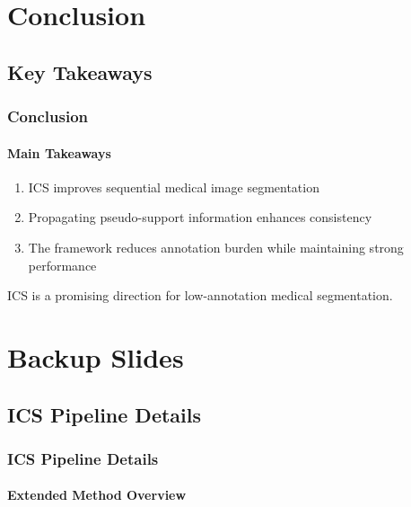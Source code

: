 \documentclass[nometaot,lecture,amberg,autotoc,toc=twocolumn,indicatelastpageofframe,footlinebox]{OTHAWbeamer}
\begin{document}

\section{Conclusion}

\subsection{Key Takeaways}

\begin{frame}
    \frametitle{Conclusion}
    \framesubtitle{Main Takeaways}

    \begin{enumerate}
        \item ICS improves sequential medical image segmentation

        \item Propagating pseudo-support information enhances consistency

        \item The framework reduces annotation burden while maintaining strong performance
    \end{enumerate}

    \vspace{1em}

    \centering
    \Large
    ICS is a promising direction for low-annotation medical segmentation.

\end{frame}

\begin{thankyouframe}
\end{thankyouframe}


\appendix

\section{Backup Slides}

\subsection{ICS Pipeline Details}

\begin{frame}
    \frametitle{ICS Pipeline Details}
    \framesubtitle{Extended Method Overview}


\end{frame}
\end{document}
